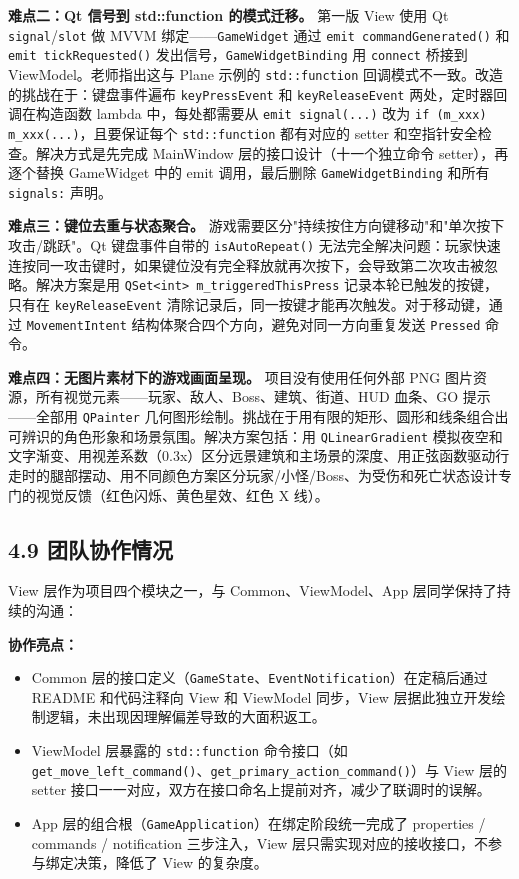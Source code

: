\documentclass[12pt,fontset=none]{ctexart}
\begin{document}
\textbf{难点二：Qt 信号到 std::function 的模式迁移。} 第一版 View 使用 Qt \texttt{signal}/\texttt{slot} 做 MVVM 绑定——\texttt{GameWidget} 通过 \texttt{emit commandGenerated()} 和 \texttt{emit tickRequested()} 发出信号，\texttt{GameWidgetBinding} 用 \texttt{connect} 桥接到 ViewModel。老师指出这与 Plane 示例的 \texttt{std::function} 回调模式不一致。改造的挑战在于：键盘事件遍布 \texttt{keyPressEvent} 和 \texttt{keyReleaseEvent} 两处，定时器回调在构造函数 lambda 中，每处都需要从 \texttt{emit signal(...)} 改为 \texttt{if (m\_xxx) m\_xxx(...)}，且要保证每个 \texttt{std::function} 都有对应的 setter 和空指针安全检查。解决方式是先完成 MainWindow 层的接口设计（十一个独立命令 setter），再逐个替换 GameWidget 中的 emit 调用，最后删除 \texttt{GameWidgetBinding} 和所有 \texttt{signals:} 声明。

\textbf{难点三：键位去重与状态聚合。} 游戏需要区分"持续按住方向键移动"和"单次按下攻击/跳跃"。Qt 键盘事件自带的 \texttt{isAutoRepeat()} 无法完全解决问题：玩家快速连按同一攻击键时，如果键位没有完全释放就再次按下，会导致第二次攻击被忽略。解决方案是用 \texttt{QSet<int> m\_triggeredThisPress} 记录本轮已触发的按键，只有在 \texttt{keyReleaseEvent} 清除记录后，同一按键才能再次触发。对于移动键，通过 \texttt{MovementIntent} 结构体聚合四个方向，避免对同一方向重复发送 \texttt{Pressed} 命令。

\textbf{难点四：无图片素材下的游戏画面呈现。} 项目没有使用任何外部 PNG 图片资源，所有视觉元素——玩家、敌人、Boss、建筑、街道、HUD 血条、GO 提示——全部用 \texttt{QPainter} 几何图形绘制。挑战在于用有限的矩形、圆形和线条组合出可辨识的角色形象和场景氛围。解决方案包括：用 \texttt{QLinearGradient} 模拟夜空和文字渐变、用视差系数（0.3x）区分远景建筑和主场景的深度、用正弦函数驱动行走时的腿部摆动、用不同颜色方案区分玩家/小怪/Boss、为受伤和死亡状态设计专门的视觉反馈（红色闪烁、黄色星效、红色 X 线）。


\subsection{4.9 团队协作情况}

View 层作为项目四个模块之一，与 Common、ViewModel、App 层同学保持了持续的沟通：

\textbf{协作亮点：}

\begin{itemize}
\item Common 层的接口定义（\texttt{GameState}、\texttt{EventNotification}）在定稿后通过 README 和代码注释向 View 和 ViewModel 同步，View 层据此独立开发绘制逻辑，未出现因理解偏差导致的大面积返工。
\item ViewModel 层暴露的 \texttt{std::function} 命令接口（如 \texttt{get\_move\_left\_command()}、\texttt{get\_primary\_action\_command()}）与 View 层的 setter 接口一一对应，双方在接口命名上提前对齐，减少了联调时的误解。
\item App 层的组合根（\texttt{GameApplication}）在绑定阶段统一完成了 properties / commands / notification 三步注入，View 层只需实现对应的接收接口，不参与绑定决策，降低了 View 的复杂度。
\end{itemize}
\end{document}
